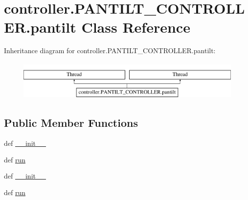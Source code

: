 \hypertarget{classcontroller_1_1PANTILT__CONTROLLER_1_1pantilt}{}\section{controller.\+P\+A\+N\+T\+I\+L\+T\+\_\+\+C\+O\+N\+T\+R\+O\+L\+L\+E\+R.\+pantilt Class Reference}
\label{classcontroller_1_1PANTILT__CONTROLLER_1_1pantilt}
Inheritance diagram for controller.\+P\+A\+N\+T\+I\+L\+T\+\_\+\+C\+O\+N\+T\+R\+O\+L\+L\+E\+R.\+pantilt\+:\begin{figure}[H]
\begin{center}
\leavevmode
\includegraphics[height=2.000000cm]{classcontroller_1_1PANTILT__CONTROLLER_1_1pantilt}
\end{center}
\end{figure}
\subsection*{Public Member Functions}
\begin{DoxyCompactItemize}
\item 
def \hyperlink{classcontroller_1_1PANTILT__CONTROLLER_1_1pantilt_a7de0de26f776775e5f1f4f165eabad5a}{\+\_\+\+\_\+init\+\_\+\+\_\+}
\item 
def \hyperlink{classcontroller_1_1PANTILT__CONTROLLER_1_1pantilt_abdd9e553f5882fb024a18a02a23bdf85}{run}
\item 
def \hyperlink{classcontroller_1_1PANTILT__CONTROLLER_1_1pantilt_a7de0de26f776775e5f1f4f165eabad5a}{\+\_\+\+\_\+init\+\_\+\+\_\+}
\item 
def \hyperlink{classcontroller_1_1PANTILT__CONTROLLER_1_1pantilt_abdd9e553f5882fb024a18a02a23bdf85}{run}
\end{DoxyCompactItemize}

